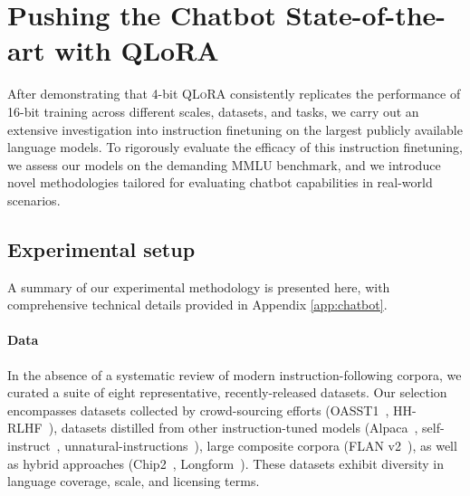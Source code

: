 \section{Pushing the Chatbot State-of-the-art with QLoRA}
\label{sec:pushing}
After demonstrating that 4-bit \textsc{QLoRA} consistently replicates the performance of 16-bit training across different scales, datasets, and tasks, we carry out an extensive investigation into instruction finetuning on the largest publicly available language models. To rigorously evaluate the efficacy of this instruction finetuning, we assess our models on the demanding MMLU benchmark, and we introduce novel methodologies tailored for evaluating chatbot capabilities in real-world scenarios.

\subsection{Experimental setup} A summary of our experimental methodology is presented here, with comprehensive technical details provided in Appendix \ref{app:chatbot}.

\paragraph{Data} In the absence of a systematic review of modern instruction-following corpora, we curated a suite of eight representative, recently-released datasets. Our selection encompasses datasets collected by crowd-sourcing efforts (OASST1~\citep{kopf2023openassistant}, HH-RLHF~\citep{bai2022training}), datasets distilled from other instruction-tuned models (Alpaca~\citep{alpaca}, self-instruct~\citep{wang2022self}, unnatural-instructions~\citep{honovich2022unnatural}), large composite corpora (FLAN v2~\citep{chung2022scaling}), as well as hybrid approaches (Chip2~\citep{laion2023}, Longform~\citep{koksal2023longform}). These datasets exhibit diversity in language coverage, scale, and licensing terms.

